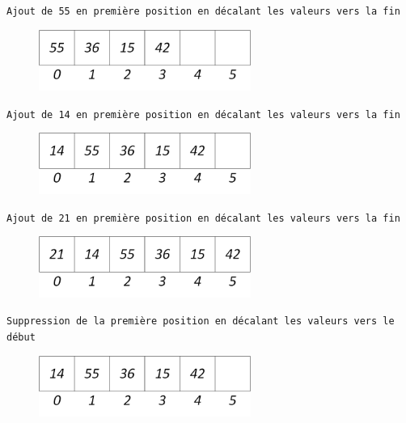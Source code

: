 \documentclass[11pt,a4paper]{article}
\begin{document}
\begin{center}

\texttt{Ajout de 55 en première position en décalant les valeurs vers la fin}

\begin{figure}[ht!]
\centering
\centerline{  %
\includegraphics[height=2cm]{img/p-1-Liste_t_4.png}
}
\end{figure}


\texttt{Ajout de 14 en première position en décalant les valeurs vers la fin}

\begin{figure}[ht!]
\centering
\centerline{  %
\includegraphics[height=2cm]{img/p-2-Liste_t_5.png}
}
\end{figure}


\texttt{Ajout de 21 en première position en décalant les valeurs vers la fin}

\begin{figure}[ht!]
\centering
\centerline{  %
\includegraphics[height=2cm]{img/p-3-Liste_t_6.png}
}
\end{figure}


\texttt{Suppression de la première position en décalant les valeurs vers le début}

\begin{figure}[ht!]
\centering
\centerline{  %
\includegraphics[height=2cm]{img/p-2-Liste_t_5.png}
}
\end{figure}



\end{center}
\end{document}
